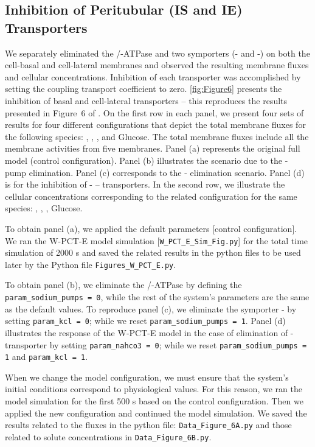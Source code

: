 \documentclass[fleqn,10pt]{physiome}
\begin{document}
\subsection{Inhibition of Peritubular (IS and IE) Transporters}
\label{Inhibition of Peritubular Transporters}
We separately eliminated the /-ATPase and two symporters (- and -) on both the cell-basal and cell-lateral membranes and observed the resulting membrane fluxes and cellular concentrations. Inhibition of each transporter was accomplished by setting the coupling transport coefficient to zero. \autoref{fig:Figure6} presents the inhibition of basal and cell-lateral transporters -- this reproduces the results presented in Figure~6 of \cite{noroozbabaee2022modular}. On the first row in
each panel, we present four sets of results for four different configurations that depict
the total membrane fluxes for the following species: , , , and Glucose. The total
membrane fluxes include all the membrane activities from five membranes. Panel (a) represents the original
full model (control configuration). Panel (b) illustrates the scenario due to the -
pump elimination. Panel (c) corresponds to the - elimination scenario. Panel
(d) is for the inhibition of - – transporters. In the second row, we illustrate the cellular concentrations corresponding to the related configuration for the same species:
, , , Glucose.

To obtain panel (a), we applied the default parameters [control configuration]. We ran the W-PCT-E model simulation [\texttt{W\_PCT\_E\_Sim\_Fig.py}] for the total time simulation of 2000 s and saved the related results in the python files to be used later by the Python file \texttt{Figures\_W\_PCT\_E.py}.

To obtain panel (b), we eliminate the /-ATPase by defining the \texttt{param\_sodium\_pumps = 0}, while the rest of the system's parameters are the same as the default values. To reproduce panel (c), we eliminate the symporter -  by setting \texttt{param\_kcl = 0};
while we reset \texttt{param\_sodium\_pumps = 1}.   Panel (d) illustrates the response of the W-PCT-E model in the case of elimination of - transporter by setting \texttt{param\_nahco3 = 0}; while we reset \texttt{param\_sodium\_pumps = 1} and  \texttt{param\_kcl = 1}. 

When we change the model configuration, we must ensure that the system's initial conditions correspond to physiological values. For this reason, we ran the model simulation for the first 500 s based on the control configuration. Then we applied the new configuration and continued the model simulation. We saved the results related to the fluxes in the python file: \texttt{Data\_Figure\_6A.py} and those related to solute concentrations in \texttt{Data\_Figure\_6B.py}.
\end{document}
